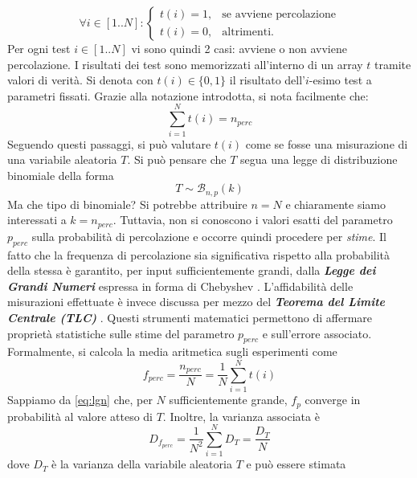\begin{equation}
    \forall i \in [1..N] : 
    \begin{cases}
        t(i) = 1 ,& \text{se avviene percolazione} \\
        t(i) = 0 ,& \text{altrimenti}.
    \end{cases}
\end{equation}
Per ogni test $i \in [1..N]$ vi sono quindi 2 casi: avviene o non avviene percolazione.
I risultati dei test sono memorizzati all'interno di un array $t$ tramite valori di verità. 
Si denota con $t(i) \in \{0,1\}$ il risultato dell'$i$-esimo test a parametri fissati.
Grazie alla notazione introdotta, si nota facilmente che:
\begin{equation}
    \sum_{i=1}^{N} t(i) = n_{perc}
\end{equation}
Seguendo questi passaggi, si può valutare $t(i)$ come se fosse una misurazione di una 
variabile aleatoria $T$.
Si può pensare che $T$ segua una legge di distribuzione binomiale della forma
\begin{equation*}
    T \sim \mathcal{B}_{n,p}(k)
\end{equation*} 
Ma che tipo di binomiale? Si potrebbe attribuire $n=N$ e chiaramente siamo interessati a $k=n_{perc}$.
Tuttavia, non si conoscono i valori esatti del parametro $p_{perc}$ sulla probabilità di percolazione e 
occorre quindi procedere per \textit{stime}.
Il fatto che la frequenza di percolazione sia significativa rispetto alla probabilità 
della stessa è garantito, per input sufficientemente grandi, dalla \textbf{\textit{Legge dei Grandi Numeri}}
espressa in forma di Chebyshev \cite{big-numbers, chebyshev}.
L'affidabilità delle misurazioni effettuate è invece discussa per mezzo del 
\textbf{\textit{Teorema del Limite Centrale (TLC)}} \cite{tlc}.
Questi strumenti matematici permettono di affermare proprietà statistiche sulle 
stime del parametro $p_{perc}$ e sull'errore associato. Formalmente, si calcola 
la media aritmetica sugli esperimenti come 
\begin{equation}
    f_{perc} = \frac{n_{perc}}{N} = \frac{1}{N} \sum_{i=1}^{N} t(i)
\end{equation}
Sappiamo da \ref{eq:lgn} che, per $N$ sufficientemente grande, $f_p$ converge 
in probabilità al valore atteso di $T$. Inoltre, la varianza associata è
\begin{equation}
    D_{f_{perc}} = \frac{1}{N^2} \sum_{i=1}^{N} {D}_T = \frac{{D}_T}{N}
    \label{eq:d_f_perc}
\end{equation}
dove $D_T$ è la varianza della variabile aleatoria $T$ e può essere stimata 
